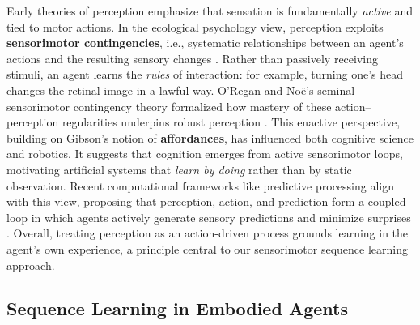 \documentclass[11pt]{article}
\begin{document}
Early theories of perception emphasize that sensation is fundamentally \emph{active} and tied to motor actions. In the ecological psychology view, perception exploits \textbf{sensorimotor contingencies}, i.e., systematic relationships between an agent’s actions and the resulting sensory changes \cite{Gibson1979}. Rather than passively receiving stimuli, an agent learns the \emph{rules} of interaction: for example, turning one’s head changes the retinal image in a lawful way. O’Regan and Noë’s seminal sensorimotor contingency theory formalized how mastery of these action–perception regularities underpins robust perception \cite{ORegan2001}. This enactive perspective, building on Gibson’s notion of \textbf{affordances}, has influenced both cognitive science and robotics. It suggests that cognition emerges from active sensorimotor loops, motivating artificial systems that \emph{learn by doing} rather than by static observation. Recent computational frameworks like predictive processing align with this view, proposing that perception, action, and prediction form a coupled loop in which agents actively generate sensory predictions and minimize surprises \cite{Clark2013}. Overall, treating perception as an action-driven process grounds learning in the agent’s own experience, a principle central to our sensorimotor sequence learning approach.

\subsection{Sequence Learning in Embodied Agents}
\end{document}
